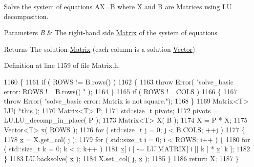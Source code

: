 Solve the system of equations AX=B where X and B are Matrices using LU decomposition. 


\begin{DoxyParams}{Parameters}
{\em B} & The right-\/hand side \hyperlink{classLuna_1_1Matrix}{Matrix} of the system of equations \\
\hline
\end{DoxyParams}
\begin{DoxyReturn}{Returns}
The solution \hyperlink{classLuna_1_1Matrix}{Matrix} (each column is a solution \hyperlink{classLuna_1_1Vector}{Vector}) 
\end{DoxyReturn}


Definition at line 1159 of file Matrix.\+h.


\begin{DoxyCode}
1160   \{
1161     \textcolor{keywordflow}{if} ( ROWS != B.rows() )
1162     \{
1163       \textcolor{keywordflow}{throw} Error( \textcolor{stringliteral}{"solve\_basic error: ROWS != B.rows() "} );
1164     \}
1165     \textcolor{keywordflow}{if} ( ROWS != COLS )
1166     \{
1167       \textcolor{keywordflow}{throw} Error( \textcolor{stringliteral}{"solve\_basic error: Matrix is not square."});
1168     \}
1169     Matrix<T> LU( *\textcolor{keyword}{this} );
1170     Matrix<T> P;
1171     std::size\_t pivots;
1172     pivots = LU.LU\_decomp\_in\_place( P );
1173     Matrix<T> X( B );
1174     X = P * X;
1175     Vector<T> \hyperlink{namespaceHeat__plot_aa88370c16b85b784ccbde3ed88bc1991}{x}( ROWS );
1176     \textcolor{keywordflow}{for} ( std::size\_t j = 0; j < B.COLS; ++j )
1177     \{
1178       \hyperlink{namespaceHeat__plot_aa88370c16b85b784ccbde3ed88bc1991}{x} = X.get\_col( j );
1179       \textcolor{keywordflow}{for} ( std::size\_t i = 0; i < ROWS; i++ ) \{
1180           \textcolor{keywordflow}{for} ( std::size\_t k = 0; k < i; k++ )
1181               \hyperlink{namespaceHeat__plot_aa88370c16b85b784ccbde3ed88bc1991}{x}[ i ] -= LU.MATRIX[ i ][ k ] * \hyperlink{namespaceHeat__plot_aa88370c16b85b784ccbde3ed88bc1991}{x}[ k ];
1182       \}
1183       LU.backsolve( \hyperlink{namespaceHeat__plot_aa88370c16b85b784ccbde3ed88bc1991}{x} );
1184       X.set\_col( j, \hyperlink{namespaceHeat__plot_aa88370c16b85b784ccbde3ed88bc1991}{x} );
1185     \}
1186     \textcolor{keywordflow}{return} X;
1187   \}
\end{DoxyCode}
\mbox{\label{classLuna_1_1Matrix_ac3c2472b984be8ef9da41b79b0f2c144}} 
